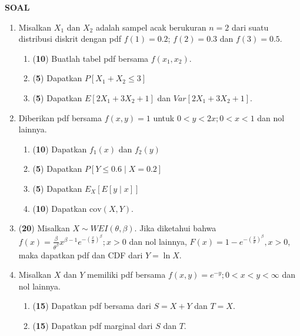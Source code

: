 \documentclass[11pt,letterpaper]{article}
\begin{document}
\begin{center}
  \textbf{SOAL}
\end{center}
\begin{enumerate}
  \item Misalkan $X_1$ dan $X_2$ adalah sampel acak berukuran $n = 2$ dari suatu distribusi diskrit dengan pdf $f(1) = 0.2$; $f(2) = 0.3$ dan $f(3) = 0.5$.
        \begin{enumerate}[label=\alph*)]
          \item (\textbf{10}) Buatlah tabel pdf bersama $f(x_1, x_2)$.
          \item (\textbf{5}) Dapatkan $P[X_1 + X_2 \le 3]$
          \item (\textbf{5}) Dapatkan $E[2X_1 + 3X_2 + 1]$ dan $Var[2X_1 + 3X_2 + 1]$.
        \end{enumerate}
        \vspace{0.3cm}

  \item Diberikan pdf bersama $f(x,y) = 1$ untuk $0 < y < 2x; 0 < x < 1$ dan nol lainnya.
        \begin{enumerate}[label=\alph*)]
          \item (\textbf{10}) Dapatkan $f_1(x)$ dan $f_2(y)$
          \item (\textbf{5}) Dapatkan $P[Y \le 0.6 \mid X = 0.2]$
          \item (\textbf{5}) Dapatkan $E_X[E[y \mid x]]$
          \item (\textbf{10}) Dapatkan $\text{cov}(X,Y)$.
        \end{enumerate}
        \vspace{0.3cm}

  \item (\textbf{20}) Misalkan $X \sim WEI(\theta, \beta)$. Jika diketahui bahwa $f(x) = \frac{\beta}{\theta^\beta} x^{\beta-1} e^{-(\frac{x}{\theta})^\beta}; x > 0$ dan nol lainnya, $F(x) = 1 - e^{-(\frac{x}{\theta})^\beta}, x > 0$, maka dapatkan pdf dan CDF dari $Y = \ln X$.
        \vspace{0.3cm}

  \item Misalkan $X$ dan $Y$ memiliki pdf bersama $f(x, y) = e^{-y}; 0 < x < y < \infty$ dan nol lainnya.
        \begin{enumerate}[label=\alph*)]
          \item (\textbf{15}) Dapatkan pdf bersama dari $S = X + Y$ dan $T = X$.
          \item (\textbf{15}) Dapatkan pdf marginal dari $S$ dan $T$.
        \end{enumerate}
\end{enumerate}
\end{document}
